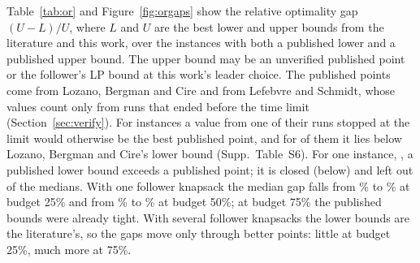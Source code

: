 \documentclass[]{spie}  %
\theoremstyle{plain}
\newcommand{\inst}[1]{\mbox{#1}}             %
\begin{document}
Table~\ref{tab:or} and Figure~\ref{fig:orgaps} show the relative optimality gap $(U-L)/U$, where
$L$ and $U$ are the best lower and upper bounds from the literature and this work, over the
instances with both a published lower and a published upper bound. The upper bound may be an
unverified published point or the follower's LP bound at this work's leader choice. The published
points come from Lozano, Bergman and Cire\cite{lozano2026network,lozano_dbo_repo} and from Lefebvre
and Schmidt,\cite{lefebvre2025dantzig} whose values count only from runs that ended before the time
limit (Section~\ref{sec:verify}). For \NumOrLsTimeLimitBest{} instances a value from one of their
runs stopped at the limit would otherwise be the best published point, and for
\NumOrLsTimeLimitBelowLb{} of them it lies below Lozano, Bergman and Cire's lower bound (Supp.\
Table~S6). For one instance, \inst{\OrClosureName}, a published lower bound exceeds a published
point; it is closed (below) and left out of the medians. With one follower
knapsack the median gap falls from \OrGapOneQuarterLit\% to \OrGapOneQuarterNow\% at budget 25\%
and from \OrGapOneHalfLit\% to \OrGapOneHalfNow\% at budget 50\%; at budget 75\% the published
bounds were already tight. With several follower knapsacks the lower bounds are the literature's,
so the gaps move only through better points: little at budget 25\%, much more at 75\%.
\end{document}
